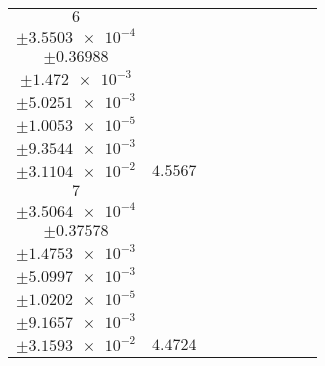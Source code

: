 \documentclass[8pt]{article}
\begin{document}
\begin{longtable}[l]{c c c c c c c c c}
$\num{6}$ & \begin{tabular}[c]{@{}c@{}}$\num{5.5278e-2}$ \\ $\pm\num{3.5503e-4}$\end{tabular} & \begin{tabular}[c]{@{}c@{}}$\num{-0.383}$ \\ $\pm\num{0.36988}$\end{tabular} & \begin{tabular}[c]{@{}c@{}}$\num{-3.415}$ \\ $\pm\num{1.472e-3}$\end{tabular} & \begin{tabular}[c]{@{}c@{}}$\num{2.0711e+3}$ \\ $\pm\num{5.0251e-3}$\end{tabular} & \begin{tabular}[c]{@{}c@{}}$\num{4.1433}$ \\ $\pm\num{1.0053e-5}$\end{tabular} & \begin{tabular}[c]{@{}c@{}}$\num{1.1941}$ \\ $\pm\num{9.3544e-3}$\end{tabular} & \begin{tabular}[c]{@{}c@{}}$\num{4.1996}$ \\ $\pm\num{3.1104e-2}$\end{tabular} & $\num{4.5567}$\\
$\num{7}$ & \begin{tabular}[c]{@{}c@{}}$\num{5.4009e-2}$ \\ $\pm\num{3.5064e-4}$\end{tabular} & \begin{tabular}[c]{@{}c@{}}$\num{-0.20103}$ \\ $\pm\num{0.37578}$\end{tabular} & \begin{tabular}[c]{@{}c@{}}$\num{3.4157}$ \\ $\pm\num{1.4753e-3}$\end{tabular} & \begin{tabular}[c]{@{}c@{}}$\num{2.0779e+3}$ \\ $\pm\num{5.0997e-3}$\end{tabular} & \begin{tabular}[c]{@{}c@{}}$\num{4.157}$ \\ $\pm\num{1.0202e-5}$\end{tabular} & \begin{tabular}[c]{@{}c@{}}$\num{1.1632}$ \\ $\pm\num{9.1657e-3}$\end{tabular} & \begin{tabular}[c]{@{}c@{}}$\num{4.2127}$ \\ $\pm\num{3.1593e-2}$\end{tabular} & $\num{4.4724}$\\

\end{longtable}
\end{document}
